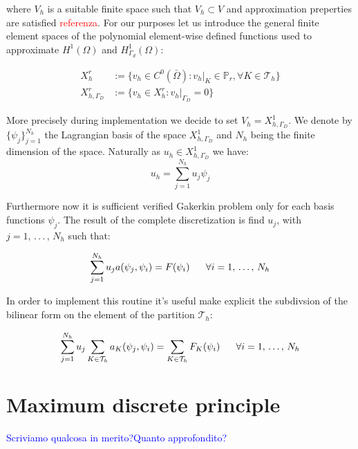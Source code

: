 where $V_h$ is a suitable finite space such that $V_h \subset V$ and approximation preperties are satisfied \textcolor{red}{referenza}.
For our purposes let us introduce the general finite element spaces of the polynomial element-wise defined functions used to approximate $H^1(\Omega)$ and $H^1_{\Gamma_d}(\Omega)$:

\begin{align}
X^r_h &:= \{v_h \in C^0(\bar{\Omega}): v_h|_K\in \mathbb{P}_r,\forall K \in \mathcal{T}_h \} \\
X^r_{h,\Gamma_D} & := \{ v_h \in X^r_h: v_h|_{\Gamma_D} = 0 \} 
\end{align}

More precisely during implementation we decide to set $V_h = X^1_{h,\Gamma_D}$. 
We denote by $\{ \psi_j \}_{j=1}^{N_h} $ the Lagrangian basis of the space $X^1_{h,\Gamma_D}$ and $N_h$ being the finite dimension of the space. Naturally  as $u_h \in X^1_{h,\Gamma_D}$ we have:
\begin{equation}
u_h = \sum_{j=1}^{N_h} u_j \psi_j
\end{equation}

Furthermore now it is sufficient verified Gakerkin problem  only for each basis functions $\psi_j$. The result of the complete discretization is find $u_j$, with $j = 1, \, . \, . \, . \, , \, N_h$ such that:

\begin{equation}
\sum_{j=1}^{N_h}u_ja(\psi_j,\psi_i) = F(\psi_i) \psp{10} \forall i = 1, \, . \, . \, . \, , \, N_h
\end{equation}

In order to implement this routine it's useful make explicit the subdivsion of the bilinear form on the element of the partition $\mathcal{T}_h$:

\begin{equation}
\sum_{j=1}^{N_h}u_j\sum_{K\in \mathcal{T}_h}a_K(\psi_j,\psi_i) = \sum_{K\in \mathcal{T}_h}F_K(\psi_i) \psp{10} \forall i = 1, \, . \, . \, . \, , \, N_h
\end{equation}






\section{Maximum discrete principle}
\textcolor{blue}{Scriviamo qualcosa in merito?Quanto approfondito?}




